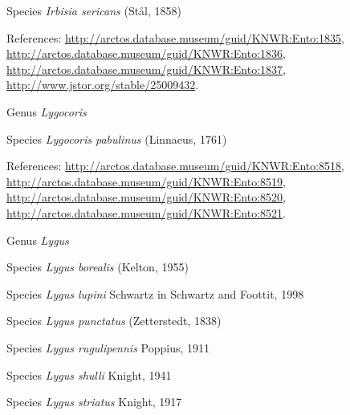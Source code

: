 \documentclass[9pt, article]{memoir}
\begin{document}
\begin{multicols}{2}
\vspace{6pt}\noindent\hspace{36pt}Species \textit{Irbisia sericans} (Stål, 1858)


\vspace{6pt}References: 
\url{http://arctos.database.museum/guid/KNWR:Ento:1835}, 
\url{http://arctos.database.museum/guid/KNWR:Ento:1836}, 
\url{http://arctos.database.museum/guid/KNWR:Ento:1837}, 
\url{http://www.jstor.org/stable/25009432}.

\vspace{6pt}\noindent\hspace{30pt}Genus \textit{Lygocoris}


\vspace{6pt}\noindent\hspace{36pt}Species \textit{Lygocoris pabulinus} (Linnaeus, 1761)


\vspace{6pt}References: 
\url{http://arctos.database.museum/guid/KNWR:Ento:8518}, 
\url{http://arctos.database.museum/guid/KNWR:Ento:8519}, 
\url{http://arctos.database.museum/guid/KNWR:Ento:8520}, 
\url{http://arctos.database.museum/guid/KNWR:Ento:8521}.

\vspace{6pt}\noindent\hspace{30pt}Genus \textit{Lygus}


\vspace{6pt}\noindent\hspace{36pt}Species \textit{Lygus borealis} (Kelton, 1955)


\vspace{6pt}\noindent\hspace{36pt}Species \textit{Lygus lupini} Schwartz in Schwartz and Foottit, 1998


\vspace{6pt}\noindent\hspace{36pt}Species \textit{Lygus punctatus} (Zetterstedt, 1838)


\vspace{6pt}\noindent\hspace{36pt}Species \textit{Lygus rugulipennis} Poppius, 1911


\vspace{6pt}\noindent\hspace{36pt}Species \textit{Lygus shulli} Knight, 1941


\vspace{6pt}\noindent\hspace{36pt}Species \textit{Lygus striatus} Knight, 1917



\end{multicols}
\end{document}
